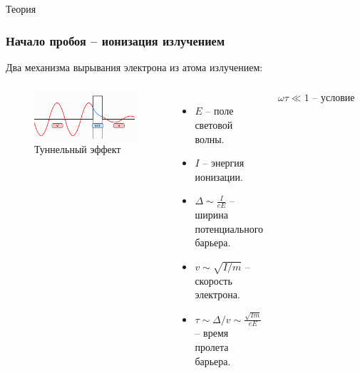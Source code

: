\documentclass{beamer}
\begin{document}
	
	\begin{frame}[plain,c]
		
		\begin{center}
			\huge {} Теория
		\end{center}
		
	\end{frame}
	
		\begin{frame}
		\frametitle{Начало пробоя -- ионизация излучением}
		\vspace{-5pt}
		Два механизма вырывания электрона из атома излучением:
		\begin{columns}
			\begin{figure}
				\centering
				\includegraphics[width=\linewidth]{res/tunneling.png}
				\caption*{Туннельный эффект}
			\end{figure}
			\vspace{-10pt}
			\footnotesize
			\begin{itemize}
				\setlength\itemsep{-2pt}
				\item $E$ -- поле световой волны.
				\item $I$ -- энергия ионизации.
				\item $\Delta \sim \frac{I}{eE}$ -- ширина потенциального барьера.
				\item $v \sim \sqrt{I/m}$ -- скорость электрона.
				\item $\tau \sim \Delta / v \sim \frac{\sqrt{Im}}{eE}$ -- время пролета барьера.
			\end{itemize}
			$$\omega \tau \ll 1 \text{ -- условие статичности поля.}$$
			

\end{columns}
\end{frame}
\end{document}
